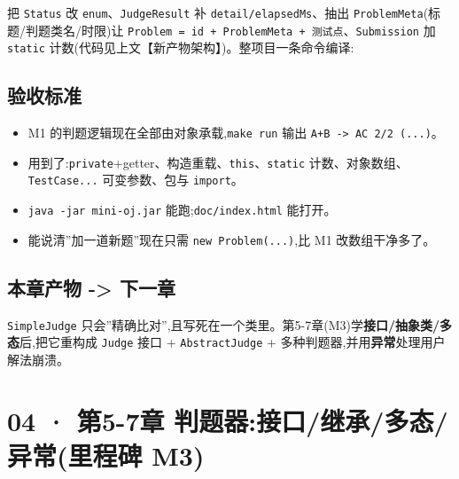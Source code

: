 \documentclass[
  11pt,
]{ctexart}
\newenvironment{Shaded}{\begin{snugshade}}{\end{snugshade}}
\newcommand{\AttributeTok}[1]{\textcolor[rgb]{0.13,0.29,0.53}{#1}}
\newcommand{\ExtensionTok}[1]{#1}
\newcommand{\FunctionTok}[1]{\textcolor[rgb]{0.13,0.29,0.53}{\textbf{#1}}}
\newcommand{\NormalTok}[1]{#1}
\newcommand{\StringTok}[1]{\textcolor[rgb]{0.31,0.60,0.02}{#1}}
\newcommand{\VariableTok}[1]{\textcolor[rgb]{0.00,0.00,0.00}{#1}}
\providecommand{\tightlist}{%
  \setlength{\itemsep}{0pt}\setlength{\parskip}{0pt}}
\begin{document}
把 \texttt{Status} 改 \texttt{enum}、\texttt{JudgeResult} 补
\texttt{detail/elapsedMs}、抽出
\texttt{ProblemMeta}(标题/判题类名/时限)让
\texttt{Problem\ =\ id\ +\ ProblemMeta\ +\ 测试点}、\texttt{Submission}
加 \texttt{static} 计数(代码见上文【新产物架构】)。整项目一条命令编译:

\begin{Shaded}
\end{Shaded}

\hypertarget{ux9a8cux6536ux6807ux51c6-2}{%
\subsection{验收标准}\label{ux9a8cux6536ux6807ux51c6-2}}

\begin{itemize}
\tightlist
\item[$\square$]
  M1 的判题逻辑现在全部由对象承载,\texttt{make\ run} 输出
  \texttt{A+B\ -\textgreater{}\ AC\ 2/2\ (...)}。
\item[$\square$]
  用到了:\texttt{private}+getter、构造重载、\texttt{this}、\texttt{static}
  计数、对象数组、\texttt{TestCase...} 可变参数、包与 \texttt{import}。
\item[$\square$]
  \texttt{java\ -jar\ mini-oj.jar} 能跑;\texttt{doc/index.html} 能打开。
\item[$\square$]
  能说清''加一道新题''现在只需 \texttt{new\ Problem(...)},比 M1
  改数组干净多了。
\end{itemize}

\hypertarget{ux672cux7ae0ux4ea7ux7269---ux4e0bux4e00ux7ae0-1}{%
\subsection{本章产物 -\textgreater{}
下一章}\label{ux672cux7ae0ux4ea7ux7269---ux4e0bux4e00ux7ae0-1}}

\texttt{SimpleJudge}
只会''精确比对'',且写死在一个类里。第5-7章(M3)学\textbf{接口/抽象类/多态}后,把它重构成
\texttt{Judge} 接口 + \texttt{AbstractJudge} +
多种判题器,并用\textbf{异常}处理用户解法崩溃。

\hypertarget{ux7b2c5-7ux7ae0-ux5224ux9898ux5668ux63a5ux53e3ux7ee7ux627fux591aux6001ux5f02ux5e38ux91ccux7a0bux7891-m3}{%
\section{04 · 第5-7章 判题器:接口/继承/多态/异常(里程碑
M3)}\label{ux7b2c5-7ux7ae0-ux5224ux9898ux5668ux63a5ux53e3ux7ee7ux627fux591aux6001ux5f02ux5e38ux91ccux7a0bux7891-m3}}
\end{document}
